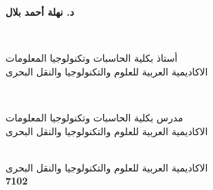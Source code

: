 \documentclass[12pt,openany]{llncs}
\begin{document}
\begin{titlepage}
{\begin{minipage}{0.40\textwidth}
{\large \bfseries 
د. نهلة أحمد بلال
}
\end{minipage}
\\[0.1cm] 
\begin{minipage}{0.48\textwidth}
\begin{flushleft}
\center
{
أستاذ بكلية الحاسبات وتكنولوجيا المعلومات
}\\
{
الاكاديمية العربية للعلوم والتكنولوجيا والنقل البحرى
}
\end{flushleft}
\end{minipage}
~
\begin{minipage}{0.48\textwidth}
\begin{flushright}
\center
{
مدرس بكلية الحاسبات وتكنولوجيا المعلومات
}\\
{
الاكاديمية العربية للعلوم والتكنولوجيا والنقل البحرى
}
\end{flushright}
\end{minipage}\\[0.5cm]
{
 الاكاديمية العربية للعلوم والتكنولوجيا والنقل البحرى
}\\[0.1cm] 
{\bfseries
 7102
}\\[0cm]


\vfill %
}


\clearpage\thispagestyle{empty}
\frontmatter
{}


\end{titlepage}
\end{document}
